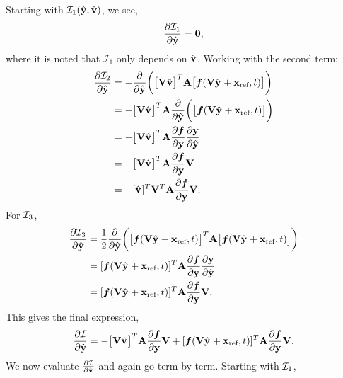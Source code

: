 \documentclass[3p,computermodern,10pt]{elsarticle}
\begin{document}
\begin{appendices}
Starting with $\minintegrand_1(\genstateyDiscrete,\genstateyDiscreteDot)$, we see,
$$\frac{\partial \minintegrand_1 }{\partial \genstateyDiscrete} = \boldsymbol 0,$$
where it is noted that $\mathcal{I}_1$ only depends on $\genstateyDiscreteDot$. Working with the second term:
\begin{align*}
\frac{\partial \minintegrand_2}{\partial \genstateyDiscrete}  &= -\frac{\partial}{\partial \genstateyDiscrete} \bigg( \big[ \basisspace \genstateyDiscreteDot \big]^T \stweightingMatArg{n} \big[ \velocity(\veloargsromy) \big] \bigg) \\ 
&= - \big[ \basisspace \genstateyDiscreteDotArgnt{} \big]^T \stweightingMatArg{n} \frac{\partial}{\partial \genstateyDiscreteArgnt{}} \bigg( \big[ \velocity(\veloargsromy) \big]  \bigg)\\
 &= -\big[ \basisspace \genstateyDiscreteDotArgnt{} \big]^T \stweightingMatArg{n}   \frac{\partial \velocity}{\partial \stateyDiscrete}\frac{\partial \stateyDiscrete}{\partial \genstateyDiscrete} \\
& = - \big[ \basisspace \genstateyDiscreteDotArgnt{} \big]^T \stweightingMatArg{n}  \frac{\partial \velocity}{\partial \stateyDiscrete}\basisspace \\
&= -[\genstateyDiscreteDotArgnt{}]^T \basisspace^T \stweightingMatArg{n} \frac{\partial \velocity}{\partial \stateyDiscrete}  \basisspace.
\end{align*}
For $\minintegrand_3$,
\begin{align}\label{eq:i3sol}
\frac{\partial  \minintegrand_3}{\partial \genstateyDiscrete}  &= \frac{1}{2} \frac{\partial }{\partial \genstateyDiscrete} \bigg( \big[\velocity(\veloargsromy) \big]^T \stweightingMatArg{n}\big[ \velocity(\veloargsromy) \big] \bigg) \\  
&=  [\velocity(\veloargsromy) ]^T \stweightingMatArg{n} \frac{\partial \velocity}{\partial \stateyDiscrete} \frac{\partial \stateyDiscrete}{\partial \genstateyDiscrete} \\
 &=   [\velocity(\veloargsromy) ]^T  \stweightingMatArg{n} \frac{\partial \velocity}{\partial \stateyDiscrete} \basisspace.
\end{align}
This gives the final expression,
$$
 \frac{\partial \minintegrand}{\partial \boldsymbol \genstateyDiscrete} = - \big[ \basisspace \genstateyDiscreteDotArgnt{} \big]^T \stweightingMatArg{n}  \frac{\partial \velocity}{\partial \stateyDiscrete}\basisspace +  [\velocity(\veloargsromy) ]^T \stweightingMatArg{n} \frac{\partial \velocity}{\partial \stateyDiscrete} \basisspace.
$$%
We now evaluate $\frac{\partial \minintegrand}{\partial \genstateyDiscreteDotArgnt{}}$ and again go term by term. Starting with $\minintegrand_1$,

\end{appendices}
\end{document}
